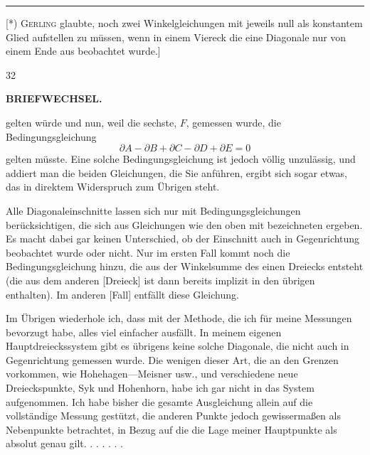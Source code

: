 \par\noindent\rule{4cm}{.4pt}\par
{\footnotesize\noindent\hspace*{\parindent}[*) \textsc{Gerling} glaubte, noch zwei Winkelgleichungen mit jeweils null als konstantem Glied aufstellen zu müssen, wenn in einem Viereck die eine Diagonale nur von einem Ende aus beobachtet wurde.]\par}
\hfill{\small 32}\hspace*{.12\linewidth}\par

\par\clearpage
\noindent{}\hfill{\small\textbf{BRIEFWECHSEL.}}\hfill\null\par\medskip

\noindent gelten würde und nun, weil die sechste, \(F\),  gemessen wurde, die Bedingungsgleichung
\[
 \partial A-\partial B+\partial C-\partial D+\partial E=0
\]
\noindent gelten müsste. Eine solche Bedingungsgleichung ist jedoch völlig unzulässig, und addiert man die beiden Gleichungen, die Sie anführen, ergibt sich sogar etwas, das in direktem Widerspruch zum Übrigen steht.

Alle Diagonaleinschnitte lassen sich nur mit  Bedingungsgleichungen berücksichtigen, die sich aus Gleichungen wie den oben mit \mbox{} bezeichneten ergeben. Es macht dabei gar keinen Unterschied, ob der Einschnitt auch in Gegenrichtung beobachtet wurde oder nicht. Nur im ersten Fall kommt noch die Bedingungsgleichung hinzu, die aus der Winkelsumme des einen Dreiecks entsteht (die aus dem anderen [Dreieck] ist dann bereits implizit in den übrigen enthalten). Im anderen [Fall] entfällt diese Gleichung.

Im Übrigen wiederhole ich, dass mit der Methode, die ich für meine Messungen bevorzugt habe, alles viel einfacher ausfällt. In meinem eigenen Hauptdreieckssystem gibt es übrigens keine solche Diagonale, die nicht auch in Gegenrichtung gemessen wurde. Die wenigen dieser Art, die an den Grenzen vorkommen, wie Hohehagen—Meisner usw., und verschiedene neue Dreieckspunkte, Syk und Hohenhorn, habe ich gar nicht in das System aufgenommen. Ich habe bisher die gesamte Ausgleichung allein auf die vollständige Messung gestützt, die anderen Punkte jedoch gewissermaßen als Nebenpunkte betrachtet, in Bezug auf die die Lage meiner Hauptpunkte als absolut genau gilt. . . . . . .

